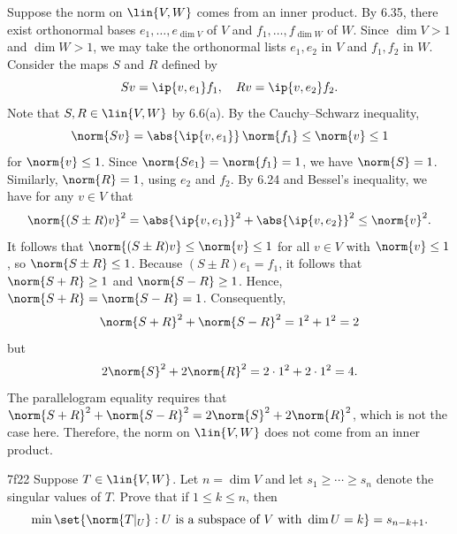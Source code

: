 \begin{sol}
    Suppose the norm on $\lin{V, W}$ comes from an inner product.
    By 6.35, there exist orthonormal bases $e_1, \ldots, e_{\dim V}$ of $V$ and $f_1, \ldots, f_{\dim W}$ of $W$.
    Since $\dim V > 1$ and $\dim W > 1$, we may take the orthonormal lists $e_1, e_2$ in $V$ and $f_1, f_2$ in $W$.
    Consider the maps $S$ and $R$ defined by
    \[
        Sv = \ip{v, e_1} f_1, \quad Rv = \ip{v, e_2} f_2.
    \]
    Note that $S, R \in \lin{V, W}$ by 6.6(a).
    By the Cauchy--Schwarz inequality,
    \[
        \norm{Sv} = \abs{\ip{v, e_1}}\,\norm{f_1} \leq \norm{v} \leq 1
    \]
    for $\norm{v} \leq 1$.
    Since $\norm{S e_1} = \norm{f_1} = 1$, we have $\norm{S} = 1$.
    Similarly, $\norm{R} = 1$, using $e_2$ and $f_2$.
    By 6.24 and Bessel's inequality, we have for any $v \in V$ that
    \[
        \norm{(S \pm R)v}^2 = \abs{\ip{v, e_1}}^2 + \abs{\ip{v, e_2}}^2 \leq \norm{v}^2.
    \]
    It follows that $\norm{(S \pm R)v} \leq \norm{v} \leq 1$ for all $v \in V$ with $\norm{v} \leq 1$, so $\norm{S \pm R} \leq 1$.
    Because $(S \pm R) e_1 = f_1$, it follows that $\norm{S + R} \geq 1$ and $\norm{S - R} \geq 1$.
    Hence, $\norm{S + R} = \norm{S - R} = 1$.
    Consequently,
    \[
        \norm{S + R}^2 + \norm{S - R}^2 = 1^2 + 1^2 = 2
    \]
    but
    \[
        2 \norm{S}^2 + 2 \norm{R}^2 = 2 \cdot 1^2 + 2 \cdot 1^2 = 4.
    \]
    The parallelogram equality requires that $\norm{S + R}^2 + \norm{S - R}^2 = 2 \norm{S}^2 + 2 \norm{R}^2$, which is not the case here.
    Therefore, the norm on $\lin{V, W}$ does not come from an inner product.
\end{sol}

\begin{exercise}{7f22}
    Suppose $T \in \lin{V, W}$.
    Let $n = \dim V$ and let $s_1 \geq \cdots \geq s_n$ denote the singular values of $T$.
    Prove that if $1 \leq k \leq n$, then
    \[
        \min\set{\norm{T|_U} : U \text{ is a subspace of } V \text{ with } \dim U = k} = s_{n-k+1}.
    \]
\end{exercise}

